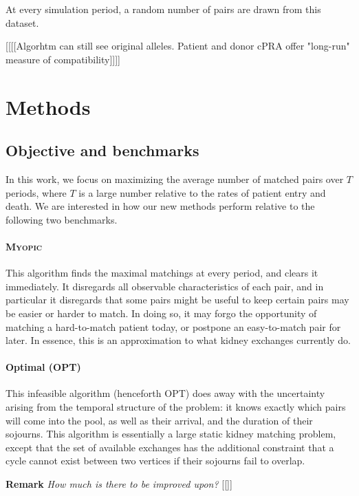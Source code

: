 \documentclass[format=acmsmall, review=false]{acmart}
\begin{document}
At every simulation period, a random number of pairs are drawn from this dataset.

[[[[Algorhtm can still see original alleles. Patient and donor cPRA offer "long-run" measure of compatibility]]]]


\section{Methods}

\subsection{Objective and benchmarks}

In this work, we focus on maximizing the average number of matched pairs over $T$ periods, where $T$ is a large number relative to the rates of patient entry and death. We are interested in how our new methods perform relative to the following two benchmarks.

\paragraph{\textsc{Myopic}}

This algorithm finds the maximal matchings at every period, and clears it immediately. It disregards all observable characteristics of each pair, and in particular it disregards that some pairs might be useful to keep certain pairs may be easier or harder to match. In doing so, it may forgo the opportunity of matching a hard-to-match patient today, or postpone an easy-to-match pair for later. In essence, this is an approximation to what kidney exchanges currently do.

\paragraph{Optimal (\textsc{OPT})} This infeasible algorithm (henceforth OPT) does away with the uncertainty arising from the temporal structure of the problem: it knows exactly which pairs will come into the pool, as well as their arrival, and the duration of their sojourns. This algorithm is essentially a large static kidney matching problem, except that the set of available exchanges has the additional constraint that a cycle cannot exist between two vertices if their sojourns fail to overlap.

\textbf{Remark} \textit{How much is there to be improved upon?} [[]]
\end{document}

